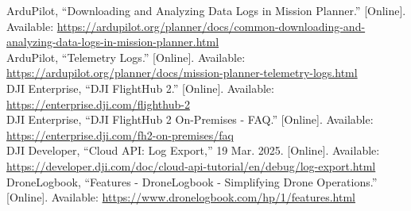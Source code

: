 \documentclass[11pt,a4paper]{article}
\begin{document}
{\noindent[11] ArduPilot, ``Downloading and Analyzing Data Logs in Mission Planner.'' [Online]. Available: \url{https://ardupilot.org/planner/docs/common-downloading-and-analyzing-data-logs-in-mission-planner.html}\\[0.25em]
\noindent[12] ArduPilot, ``Telemetry Logs.'' [Online]. Available: \url{https://ardupilot.org/planner/docs/mission-planner-telemetry-logs.html}\\[0.25em]
\noindent[13] DJI Enterprise, ``DJI FlightHub 2.'' [Online]. Available: \url{https://enterprise.dji.com/flighthub-2}\\[0.25em]
\noindent[14] DJI Enterprise, ``DJI FlightHub 2 On-Premises - FAQ.'' [Online]. Available: \url{https://enterprise.dji.com/fh2-on-premises/faq}\\[0.25em]
\noindent[15] DJI Developer, ``Cloud API: Log Export,'' 19 Mar. 2025. [Online]. Available: \url{https://developer.dji.com/doc/cloud-api-tutorial/en/debug/log-export.html}\\[0.25em]
\noindent[16] DroneLogbook, ``Features - DroneLogbook - Simplifying Drone Operations.'' [Online]. Available: \url{https://www.dronelogbook.com/hp/1/features.html}
}
\end{document}

